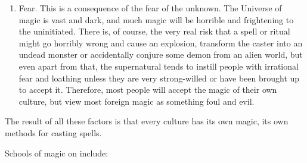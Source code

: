 \begin{enumerate}
  \item Fear. 
    This is a consequence of the fear of the unknown. The Universe of magic is vast and dark, and much magic will be horrible and frightening to the uninitiated. There is, of course, the very real risk that a spell or ritual might go horribly wrong and cause an explosion, transform the caster into an undead monster or accidentally conjure some demon from an alien world, but even apart from that, the supernatural tends to instill people with irrational fear and loathing unless they are very strong-willed or have been brought up to accept it. Therefore, most people will accept the magic of their own culture, but view most foreign magic as something foul and evil. 
\end{enumerate}

The result of all these factors is that every culture has its own magic, its own methods for casting spells. 

Schools of magic on \Miith{} include: 





